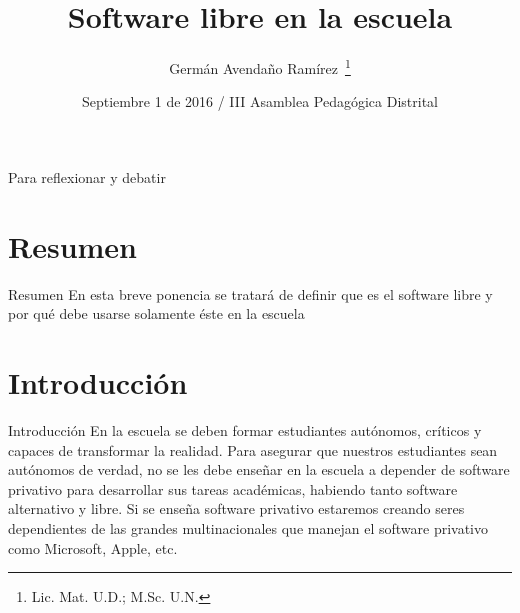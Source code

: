\documentclass{beamer}
\title{Software libre en la escuela}
\author{Germán Avendaño Ramírez~\thanks{Lic. Mat. U.D.; M.Sc. U.N.}}
\institute[Universities of Somewhere and Elsewhere] %
{
  \inst{}%
  Docente de Matemáticas\\
  Colegio Arborizadora Baja I.E.D.\\
  \vskip5mm
  Delegado a la Asamblea\\
  ADE
  }
\date{Septiembre 1 de 2016 / III Asamblea Pedagógica Distrital}
\begin{document}
\begin{frame}
  \titlepage
\end{frame}

\begin{frame}{Para reflexionar y debatir}
  \tableofcontents
\end{frame}




\section{Resumen}
\begin{frame}{Resumen}
En esta breve ponencia se tratará de definir que es el software libre y por qué debe usarse solamente éste en la escuela
\end{frame}
\section[Introducción]{Introducción}
\begin{frame}{Introducción}
En la escuela se deben formar estudiantes autónomos, críticos y capaces de transformar la realidad. Para asegurar que nuestros estudiantes sean autónomos de verdad, no se les debe enseñar en la escuela a depender de software privativo para desarrollar sus tareas académicas, habiendo tanto software alternativo y libre. Si se enseña software privativo estaremos creando seres dependientes de las grandes multinacionales que manejan el software privativo como Microsoft, Apple, etc.
\end{frame} 
\end{document}

